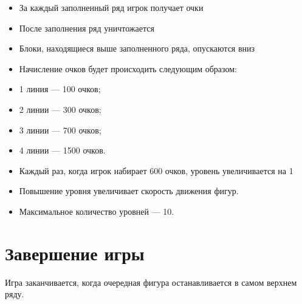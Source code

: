 \documentclass[12pt,a4paper]{article}
\begin{document}
\begin{itemize}
\item За каждый заполненный ряд игрок получает очки
\item После заполнения ряд уничтожается
\item Блоки, находящиеся выше заполненного ряда, опускаются вниз

\item Начисление очков будет происходить следующим образом:
\item 1 линия — 100 очков;
\item 2 линии — 300 очков;
\item 3 линии — 700 очков;
\item 4 линии — 1500 очков.

\item Каждый раз, когда игрок набирает 600 очков, уровень увеличивается на 1
\item Повышение уровня увеличивает скорость движения фигур.
\item Максимальное количество уровней — 10.
\end{itemize}

\section{Завершение игры}

Игра заканчивается, когда очередная фигура останавливается в самом верхнем ряду.
\end{document}

